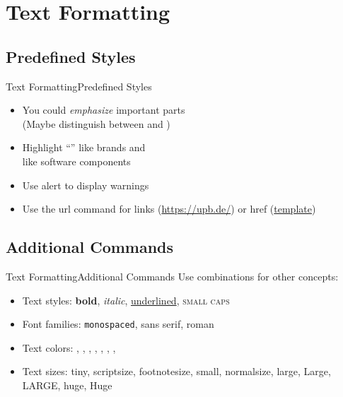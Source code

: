 \documentclass{beamer}
\begin{document}
\section{Text Formatting}
\subsection{Predefined Styles}
\begin{frame}{Text Formatting}{Predefined Styles}
	\begin{itemize}
		\item You could \emph{emphasize} important parts \\(Maybe distinguish between  and )
		\item Highlight ``'' like brands and\\  like software components
		\item Use alert to display \alert{warnings}
		\item Use the url command for links (\url{https://upb.de/}) or href (\href{https://github.com/adibaba/templates}{template})
	\end{itemize}
\end{frame}

\subsection{Additional Commands}
\begin{frame}{Text Formatting}{Additional Commands}
	Use combinations for other concepts:
	\begin{itemize}
		\item Text styles: \textbf{bold}, \textit{italic}, \underline{underlined}, \textsc{small caps}
		\item Font families: \texttt{monospaced}, \textsf{sans serif}, \textrm{roman}
		\item Text colors: , , , , , , , 
		\item Text sizes: {\tiny tiny}, {\scriptsize scriptsize}, {\footnotesize footnotesize}, {\small small}, {\normalsize normalsize}, {\large large}, {\Large Large}, {\LARGE LARGE}, {\huge huge}, {\Huge Huge}
	\end{itemize}
\end{frame}
\end{document}

